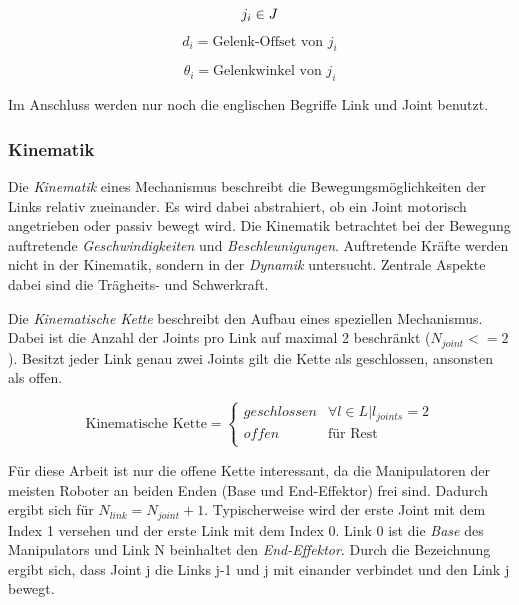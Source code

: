 \begin{displaymath}
j_i \in J \\
\end{displaymath}

\begin{equation}
d_i =  \text{Gelenk-Offset von } j_i
\end{equation}

\begin{equation}
\theta_i =  \text{Gelenkwinkel von } j_i 
\end{equation}

Im Anschluss werden nur noch die englischen Begriffe Link und Joint benutzt.

\subsubsection{Kinematik}
\label{sec:basics-ik-k}

Die \textit{Kinematik} eines Mechanismus beschreibt die Bewegungsmöglichkeiten der Links relativ zueinander. Es wird dabei abstrahiert, ob ein Joint motorisch angetrieben oder passiv bewegt wird. Die Kinematik betrachtet bei der Bewegung auftretende \textit{Geschwindigkeiten} und \textit{Beschleunigungen}. Auftretende Kräfte werden nicht in der Kinematik, sondern in der \textit{Dynamik} untersucht. Zentrale Aspekte dabei sind die Trägheits- und Schwerkraft.

Die \textit{Kinematische Kette} beschreibt den Aufbau eines speziellen Mechanismus. Dabei ist die Anzahl der Joints pro Link auf maximal 2 beschränkt ($N_{joint} <= 2$). Besitzt jeder Link genau zwei Joints gilt die Kette als geschlossen, ansonsten als offen.

\begin{equation}
	 \text{Kinematische Kette} = 
	\begin{cases}
		geschlossen & \forall l \in L | l_{joints} = 2 \\
		offen & \text{für Rest} \\
	\end{cases}
\end{equation}

Für diese Arbeit ist nur die offene Kette interessant, da die Manipulatoren der meisten Roboter an beiden Enden (Base und End-Effektor) frei sind. Dadurch ergibt sich für $N_{link} = N_{joint} + 1$. Typischerweise wird der erste Joint mit dem Index 1 versehen und der erste Link mit dem Index 0. Link 0 ist die \textit{Base} des Manipulators und Link N beinhaltet den\textit{ End-Effektor}. Durch die Bezeichnung ergibt sich, dass Joint j die Links j-1 und j mit einander verbindet und den Link j bewegt. \cite{Corke2011}

